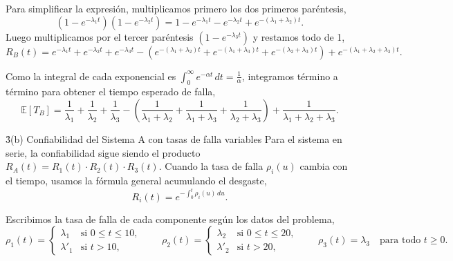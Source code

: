 \documentclass[practices.tex]{subfiles}%
\begin{document}
Para simplificar la expresión, multiplicamos primero los dos primeros paréntesis,
\begin{equation*}
    (1 - e^{-\lambda_1 t})(1 - e^{-\lambda_2 t}) = 1 - e^{-\lambda_1 t} - e^{-\lambda_2 t} + e^{-(\lambda_1 + \lambda_2)t}.
\end{equation*}
Luego multiplicamos por el tercer paréntesis $(1 - e^{-\lambda_3 t})$ y restamos todo de 1,
\begin{equation*}
    R_B(t) = e^{-\lambda_1 t} + e^{-\lambda_2 t} + e^{-\lambda_3 t} - \left( e^{-(\lambda_1 + \lambda_2)t} + e^{-(\lambda_1 + \lambda_3)t} + e^{-(\lambda_2 + \lambda_3)t} \right) + e^{-(\lambda_1 + \lambda_2 + \lambda_3)t}.
\end{equation*}

Como la integral de cada exponencial es $\int_0^\infty e^{-\alpha t}\,dt = \frac{1}{\alpha}$, integramos término a término para obtener el tiempo esperado de falla,
\begin{equation*}
    \mathbb{E}[T_B] = \frac{1}{\lambda_1} + \frac{1}{\lambda_2} + \frac{1}{\lambda_3} - \left( \frac{1}{\lambda_1 + \lambda_2} + \frac{1}{\lambda_1 + \lambda_3} + \frac{1}{\lambda_2 + \lambda_3} \right) + \frac{1}{\lambda_1 + \lambda_2 + \lambda_3}.
\end{equation*}

\vspace{4mm}
\h3{(b) Confiabilidad del Sistema A con tasas de falla variables}
Para el sistema en serie, la confiabilidad sigue siendo el producto $R_A(t) = R_1(t) \cdot R_2(t) \cdot R_3(t)$. Cuando la tasa de falla $\rho_i(u)$ cambia con el tiempo, usamos la fórmula general acumulando el desgaste,
\begin{equation*}
    R_i(t) = e^{-\int_0^t \rho_i(u)\,du}.
\end{equation*}

Escribimos la tasa de falla de cada componente según los datos del problema,
\begin{equation*}
    \rho_1(t) = \begin{cases}
        \lambda_1 & \text{si } 0 \le t \le 10, \\[1.5mm]
        \lambda'_1 & \text{si } t > 10,
    \end{cases}
    \qquad
    \rho_2(t) = \begin{cases}
        \lambda_2 & \text{si } 0 \le t \le 20, \\[1.5mm]
        \lambda'_2 & \text{si } t > 20,
    \end{cases}
    \qquad
    \rho_3(t) = \lambda_3 \quad \text{para todo } t \ge 0.
\end{equation*}
\end{document}
